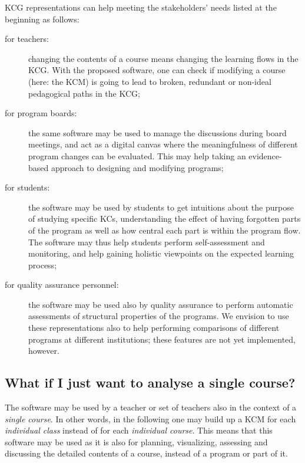 \ac{KCG} representations can help meeting the stakeholders' needs listed at
the beginning as follows:
%
\begin{description}
	\item[for teachers:] changing the contents of a course means
		changing the learning flows in the \ac{KCG}. With the
		proposed software, one can check if modifying a course
		(here: the \ac{KCM}) is going to lead to broken, redundant
		or non-ideal pedagogical paths in the \ac{KCG};
	\item[for program boards:] the same software may be used to manage
		the discussions during board meetings, and act as a digital
		canvas where the meaningfulness of different program changes
		can be evaluated. This may help taking an evidence-based
		approach to designing and modifying programs;
	\item[for students:] the software may be used by students to get
		intuitions about the purpose of studying specific \acp{KC},
		understanding the effect of having forgotten parts of the
		program as well as how central each part is within the
		program flow. The software may thus help students perform
		self-assessment and monitoring, and help gaining holistic
		viewpoints on the expected learning process;
	\item[for quality assurance personnel:] the software may be used
		also by quality assurance to perform automatic assessments
		of structural properties of the programs. We envision to use
		these representations also to help performing comparisons of
		different programs at different institutions; these features
		are not yet implemented, however.
\end{description}

\subsection{What if I just want to analyse a single course?}

The software may be used by a teacher or set of teachers also in the context
of a \emph{single course}. In other words, in the following one may build up
a \ac{KCM} for each \emph{individual class} instead of for each
\emph{individual course}. This means that this software may be used as it is
also for planning, visualizing, assessing and discussing the detailed
contents of a course, instead of a program or part of it.
